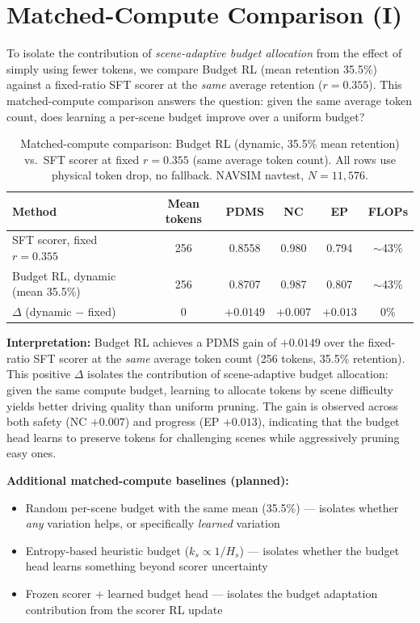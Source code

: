 \documentclass[letterpaper]{article}
\begin{document}
\section{Matched-Compute Comparison (I)}
\label{sec:matched}

To isolate the contribution of \emph{scene-adaptive budget allocation} from the effect of simply
using fewer tokens, we compare Budget RL (mean retention 35.5\%) against a fixed-ratio SFT scorer
at the \emph{same} average retention ($r{=}0.355$). This matched-compute comparison answers the
question: given the same average token count, does learning a per-scene budget improve over a
uniform budget?

\begin{table}[h]
\centering
\caption{Matched-compute comparison: Budget RL (dynamic, 35.5\% mean retention) vs.\ SFT scorer
at fixed $r{=}0.355$ (same average token count). All rows use physical token drop, no fallback.
NAVSIM navtest, $N{=}11{,}576$.}
\label{tab:matched}
\small
\begin{tabular}{@{}lccccc@{}}
\toprule
Method & Mean tokens & PDMS & NC & EP & FLOPs \\
\midrule
SFT scorer, fixed $r{=}0.355$ & 256 & 0.8558 & 0.980 & 0.794 & $\sim$43\% \\
Budget RL, dynamic (mean 35.5\%) & 256 & 0.8707 & 0.987 & 0.807 & $\sim$43\% \\
\midrule
$\Delta$ (dynamic $-$ fixed) & 0 & \textbf{$+0.0149$} & $+0.007$ & $+0.013$ & 0\% \\
\bottomrule
\end{tabular}
\end{table}

\noindent\textbf{Interpretation:} Budget RL achieves a PDMS gain of $+0.0149$ over the fixed-ratio
SFT scorer at the \emph{same} average token count (256 tokens, 35.5\% retention). This positive
$\Delta$ isolates the contribution of scene-adaptive budget allocation: given the same compute
budget, learning to allocate tokens by scene difficulty yields better driving quality than uniform
pruning. The gain is observed across both safety (NC $+0.007$) and progress (EP $+0.013$),
indicating that the budget head learns to preserve tokens for challenging scenes while aggressively
pruning easy ones.

\medskip
\noindent\textbf{Additional matched-compute baselines (planned):}
\begin{itemize}
  \item Random per-scene budget with the same mean (35.5\%) --- isolates whether \emph{any}
    variation helps, or specifically \emph{learned} variation
  \item Entropy-based heuristic budget ($k_s \propto 1/H_s$) --- isolates whether the budget
    head learns something beyond scorer uncertainty
  \item Frozen scorer + learned budget head --- isolates the budget adaptation contribution
    from the scorer RL update
\end{itemize}
\end{document}
